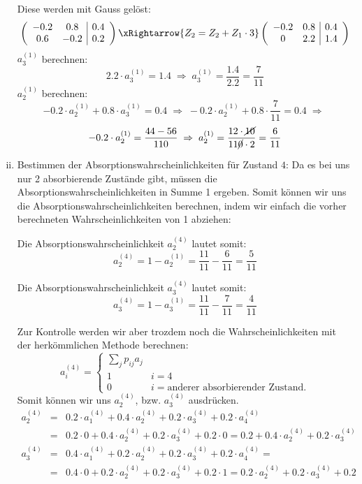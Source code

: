 \documentclass{scrreprt}
\begin{document}
\begin{uebsp}
\begin{Answer}
\begin{enumerate}[i)]
        Diese werden mit Gauss gelöst:
        \[\left(\begin{array}{cc|c}
        -0.2 & 0.8 & 0.4\\
        0.6 & -0.2 & 0.2\\
        \end{array}\right)\xRightarrow{Z_2=Z_2+Z_1\cdot 3}
        \left(\begin{array}{cc|c}
        -0.2 & 0.8 & 0.4\\
        0 & 2.2 & 1.4\\
        \end{array}\right)\]
        $a_3^{(1)}$ berechnen:
        \[2.2\cdot a_3^{(1)}=1.4\;\Rightarrow\;a_3^{(1)}=\frac{1.4}{2.2}=\frac{7}{11}\]
        $a_2^{(1)}$ berechnen:
        \[-0.2\cdot a_2^{(1)}+0.8\cdot a_3^{(1)}=0.4\;\Rightarrow\;-0.2\cdot a_2^{(1)}+0.8\cdot \frac{7}{11}=0.4\;\Rightarrow\;\]
        \[-0.2\cdot a_2^{(1)}=\frac{44-56}{110}\;\Rightarrow\;a_2^{(1)}=\frac{12\cdot \cancel{10}}{11\cancel0\cdot 2}=\frac{6}{11}\]

    \item Bestimmen der Absorptionswahrscheinlichkeiten für Zustand $4$:
        Da es bei uns nur 2 absorbierende Zustände gibt, müssen die Absorptionswahrscheinlichkeiten in Summe 1 ergeben. Somit können wir uns die Absorptionswahrscheinlichkeiten berechnen, indem wir einfach die vorher berechneten Wahrscheinlichkeiten von 1 abziehen:

        Die Absorptionswahrscheinlichkeit $a_2^{(4)}$ lautet somit:
        \[a_2^{(4)}=1-a_2^{(1)}=\frac{11}{11}-\frac{6}{11}=\frac{5}{11}\]

        Die Absorptionswahrscheinlichkeit $a_3^{(4)}$ lautet somit:
        \[a_3^{(4)}=1-a_3^{(1)}=\frac{11}{11}-\frac{7}{11}=\frac{4}{11}\]

        Zur Kontrolle werden wir aber trozdem noch die Wahrscheinlichkeiten mit der herkömmlichen Methode berechnen:
        \[a_i^{(4)}=\begin{cases}\sum_jp_{ij}a_j\\1&i=4\\0&i=\text{anderer absorbierender Zustand.}\end{cases}\]
        Somit können wir uns $a_2^{(4)}$, bzw. $a_3^{(4)}$ ausdrücken.
        \begin{eqnarray*}
            a_2^{(4)} &=& 0.2\cdot a_1^{(4)} + 0.4\cdot a_2^{(4)} + 0.2\cdot a_3^{(4)} + 0.2\cdot a_4^{(4)}\\
                &=&0.2\cdot 0 + 0.4\cdot a_2^{(4)} + 0.2\cdot a_3^{(4)} + 0.2\cdot 0=0.2 + 0.4\cdot a_2^{(4)} + 0.2\cdot a_3^{(4)}\\
            a_3^{(4)} &=& 0.4\cdot a_1^{(4)} + 0.2\cdot a_2^{(4)} + 0.2\cdot a_3^{(4)} + 0.2\cdot a_4^{(4)}=\\
                &=&0.4\cdot 0 + 0.2\cdot a_2^{(4)} + 0.2\cdot a_3^{(4)} + 0.2\cdot 1=0.2\cdot a_2^{(4)} + 0.2\cdot a_3^{(4)} + 0.2
        \end{eqnarray*}


\end{enumerate}
\end{Answer}
\end{uebsp}
\end{document}
